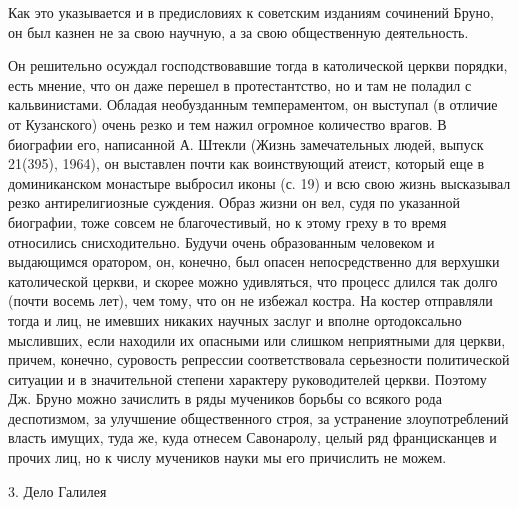 Как это указывается и в предисловиях к советским изданиям сочинений Бруно, он
был казнен не за свою научную, а за свою общественную деятельность.

Он решительно осуждал господствовавшие тогда в католической церкви порядки,
есть мнение, что он даже перешел в протестантство, но и там не поладил с
кальвинистами. Обладая необузданным темпераментом, он выступал (в отличие от
Кузанского) очень резко и тем нажил огромное количество врагов. В биографии
его, написанной
А. Штекли (Жизнь замечательных людей, выпуск 21(395), 1964), он выставлен
почти как воинствующий атеист, который еще в доминиканском монастыре
выбросил иконы (с. 19) и всю свою жизнь высказывал резко антирелигиозные
суждения. Образ жизни он вел, судя по указанной биографии, тоже совсем не
благочестивый, но к этому греху в то время относились снисходительно.
Будучи очень образованным человеком и выдающимся оратором, он, конечно, был
опасен непосредственно для верхушки католической церкви, и скорее можно
удивляться, что процесс длился так долго (почти восемь лет), чем тому, что он
не избежал костра. На костер отправляли тогда и лиц, не имевших никаких
научных заслуг и вполне ортодоксально мысливших, если находили их опасными или
слишком неприятными для церкви, причем, конечно, суровость репрессии
соответствовала серьезности политической ситуации и в значительной степени
характеру руководителей церкви. Поэтому Дж. Бруно можно зачислить в ряды
мучеников борьбы со всякого рода деспотизмом, за улучшение общественного
строя, за устранение злоупотреблений власть имущих, туда же, куда отнесем
Савонаролу, целый ряд францисканцев и прочих лиц, но к числу мучеников
науки мы его причислить не можем.

3. Дело Галилея


